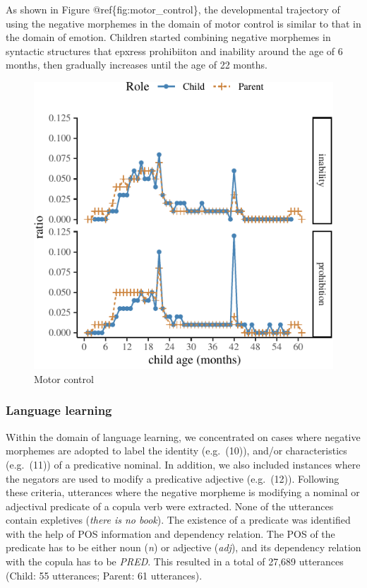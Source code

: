 \documentclass[10pt, letterpaper]{article}
\newenvironment{CodeChunk}{}{}
\begin{document}
As shown in Figure @ref\{fig:motor\_control\}, the developmental
trajectory of using the negative morphemes in the domain of motor
control is similar to that in the domain of emotion. Children started
combining negative morphemes in syntactic structures that epxress
prohibiiton and inability around the age of 6 months, then gradually
increases until the age of 22 months.

\begin{CodeChunk}
\begin{figure}[H]

{\centering \includegraphics{figs/motor_control-1} 

}

\caption[Motor control]{Motor control}\label{fig:motor_control}
\end{figure}
\end{CodeChunk}

\hypertarget{language-learning}{%
\subsubsection{Language learning}\label{language-learning}}

Within the domain of language learning, we concentrated on cases where
negative morphemes are adopted to label the identity (e.g.~(10)), and/or
characteristics (e.g.~(11)) of a predicative nominal. In addition, we
also included instances where the negators are used to modify a
predicative adjective (e.g.~(12)). Following these criteria, utterances
where the negative morpheme is modifying a nominal or adjectival
predicate of a copula verb were extracted. None of the utterances
contain expletives (\emph{there is no book}). The existence of a
predicate was identified with the help of POS information and dependency
relation. The POS of the predicate has to be either noun (\emph{n}) or
adjective (\emph{adj}), and its dependency relation with the copula has
to be \emph{PRED}. This resulted in a total of 27,689 utterances (Child:
55 utterances; Parent: 61 utterances).
\end{document}
